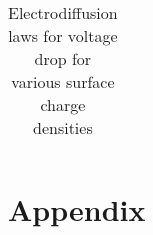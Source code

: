 \documentclass[12pt]{article}
\newcommand{\ds}{\displaystyle}
\newcommand{\eps}{\varepsilon}
\begin{document}
{\begin{table}[H]
\begin{center}
\begin{tabular}{|c|c|  }
	
	\hline
\end{tabular}
\caption{Electrodiffusion laws for voltage drop for various surface charge densities\label{t:sol}}
\end{center}
\end{table}
\section{Appendix}\label{Appendix1}
}
\end{document}

